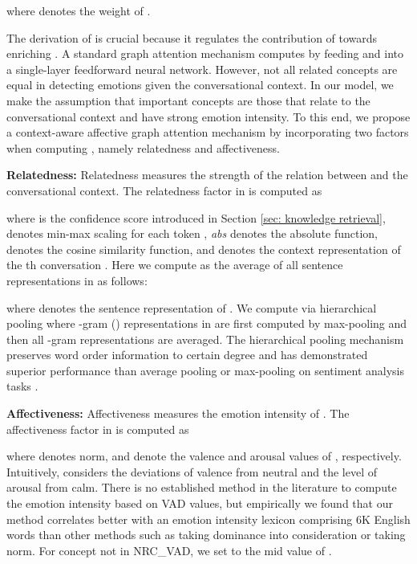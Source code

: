\documentclass[11pt,a4paper]{article}
\begin{document}
where  denotes the weight of .

The derivation of  is crucial because it regulates the contribution of  towards enriching . A standard graph attention mechanism \cite{veličković2018graph} computes  by feeding  and   into a single-layer feedforward neural network. However, not all related concepts are equal in detecting emotions given the conversational context. In our model, we make the assumption that important concepts are those that relate to the conversational context and have strong emotion intensity. To this end, we propose a context-aware affective graph attention mechanism by incorporating two factors when computing , namely relatedness and affectiveness. 

\noindent\textbf{Relatedness:} Relatedness measures the strength of the relation between  and the conversational context.  The relatedness factor in  is computed as 

where  is the confidence score introduced in Section \ref{sec: knowledge retrieval},  denotes min-max scaling for each token , \textit{abs} denotes the absolute function,  denotes the cosine similarity function, and  denotes the context representation of the th conversation . Here we compute  as the average of all sentence representations in  as follows:

where  denotes the sentence representation of . We compute  via hierarchical pooling \cite{shen2018baseline} where -gram () representations in  are first computed by max-pooling and then all -gram representations are averaged. The hierarchical pooling mechanism preserves word order information to certain degree and has demonstrated superior performance than average pooling or max-pooling on sentiment analysis tasks \cite{shen2018baseline}. 

\noindent\textbf{Affectiveness:} Affectiveness measures the emotion intensity of . The affectiveness factor in  is computed as 

where  denotes  norm,  and  denote the valence and arousal values of , respectively. Intuitively,  considers the deviations of valence from neutral and the level of arousal from calm. There is no established method in the literature to compute the emotion intensity based on VAD values, but empirically we found that our method correlates better with an emotion intensity lexicon comprising 6K English words \cite{lrec18mohammad} than other methods such as taking dominance into consideration or taking  norm. For concept  not in NRC\_VAD, we set  to the mid value of .
\end{document}
